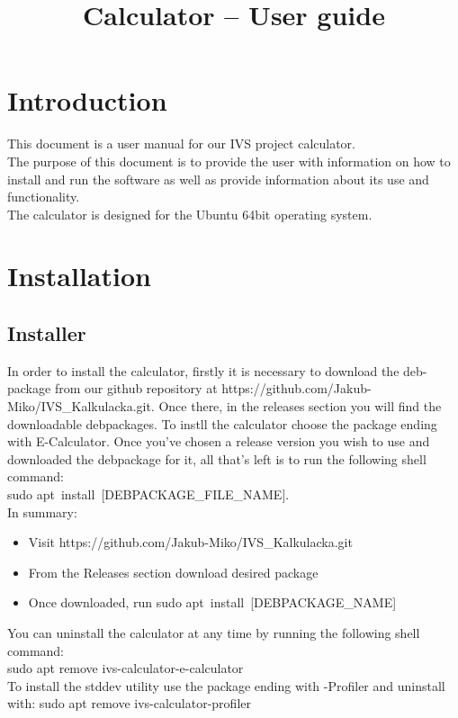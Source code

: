 \documentclass{article}
\title{Calculator -- User guide}
\date{}
\begin{document}
	\maketitle
	
	\tableofcontents
	
	\newpage
	
	\section{Introduction}
	This document is a user manual for our IVS project calculator.\\
	The purpose of this document is to provide the user with information on how to install and run the software as well as provide information about its use and functionality.\\
	The calculator is designed for the Ubuntu 64bit operating system.
	\newpage
	
	\section{Installation}
	\subsection{Installer}
	In order to install the calculator, firstly it is necessary to download the deb-package from our github repository at https://github.com/Jakub-Miko/IVS\_Kalkulacka.git. Once there, in the releases section you will find the downloadable debpackages. To instll the calculator choose the package ending with E-Calculator. Once you've chosen a release version you wish to use and downloaded the debpackage for it, all that's left is to run the following shell command: \\sudo apt\ install\ [DEBPACKAGE\_FILE\_NAME].\\
	In summary:
	\begin{itemize}
		\item{Visit https://github.com/Jakub-Miko/IVS\_Kalkulacka.git}
		\item{From the Releases section download desired package}
		\item{Once downloaded, run sudo apt\ install\ [DEBPACKAGE\_NAME]}
	\end{itemize}
	You can uninstall the calculator at any time by running the following shell command:\\
	sudo apt remove ivs-calculator-e-calculator 
	\\[5pt]
	To install the stddev utility use the package ending with -Profiler and uninstall with: sudo apt remove ivs-calculator-profiler
\end{document}
